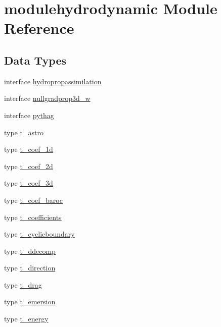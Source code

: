 \hypertarget{namespacemodulehydrodynamic}{}\section{modulehydrodynamic Module Reference}
\label{namespacemodulehydrodynamic}
\subsection*{Data Types}
\begin{DoxyCompactItemize}
\item 
interface \mbox{\hyperlink{interfacemodulehydrodynamic_1_1hydropropassimilation}{hydropropassimilation}}
\item 
interface \mbox{\hyperlink{interfacemodulehydrodynamic_1_1nullgradprop3d__w}{nullgradprop3d\+\_\+w}}
\item 
interface \mbox{\hyperlink{interfacemodulehydrodynamic_1_1pythag}{pythag}}
\item 
type \mbox{\hyperlink{structmodulehydrodynamic_1_1t__astro}{t\+\_\+astro}}
\item 
type \mbox{\hyperlink{structmodulehydrodynamic_1_1t__coef__1d}{t\+\_\+coef\+\_\+1d}}
\item 
type \mbox{\hyperlink{structmodulehydrodynamic_1_1t__coef__2d}{t\+\_\+coef\+\_\+2d}}
\item 
type \mbox{\hyperlink{structmodulehydrodynamic_1_1t__coef__3d}{t\+\_\+coef\+\_\+3d}}
\item 
type \mbox{\hyperlink{structmodulehydrodynamic_1_1t__coef__baroc}{t\+\_\+coef\+\_\+baroc}}
\item 
type \mbox{\hyperlink{structmodulehydrodynamic_1_1t__coefficients}{t\+\_\+coefficients}}
\item 
type \mbox{\hyperlink{structmodulehydrodynamic_1_1t__cyclicboundary}{t\+\_\+cyclicboundary}}
\item 
type \mbox{\hyperlink{structmodulehydrodynamic_1_1t__ddecomp}{t\+\_\+ddecomp}}
\item 
type \mbox{\hyperlink{structmodulehydrodynamic_1_1t__direction}{t\+\_\+direction}}
\item 
type \mbox{\hyperlink{structmodulehydrodynamic_1_1t__drag}{t\+\_\+drag}}
\item 
type \mbox{\hyperlink{structmodulehydrodynamic_1_1t__emersion}{t\+\_\+emersion}}
\item 
type \mbox{\hyperlink{structmodulehydrodynamic_1_1t__energy}{t\+\_\+energy}}
\item 

\end{DoxyCompactItemize}
